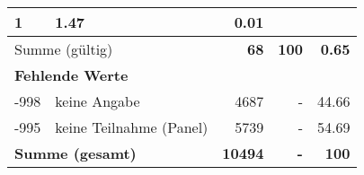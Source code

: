 \begin{longtable}{lXrrr}
       \num{1} &
       \num[round-mode=places,round-precision=2]{1.47} &
         \num[round-mode=places,round-precision=2]{0.01} \\
     \midrule
     \multicolumn{2}{l}{Summe (gültig)} &
       \textbf{\num{68}} &
     \textbf{\num{100}} &
       \textbf{\num[round-mode=places,round-precision=2]{0.65}} \\
     \multicolumn{5}{l}{\textbf{Fehlende Werte}}\\
       -998 &
       keine Angabe &
         \num{4687} &
        - &
         \num[round-mode=places,round-precision=2]{44.66} \\
       -995 &
       keine Teilnahme (Panel) &
         \num{5739} &
        - &
         \num[round-mode=places,round-precision=2]{54.69} \\
     \midrule
     \multicolumn{2}{l}{\textbf{Summe (gesamt)}} &
          \textbf{\num{10494}} &
        \textbf{-} &
        \textbf{\num{100}} \\
     \bottomrule
     \end{longtable}
     
